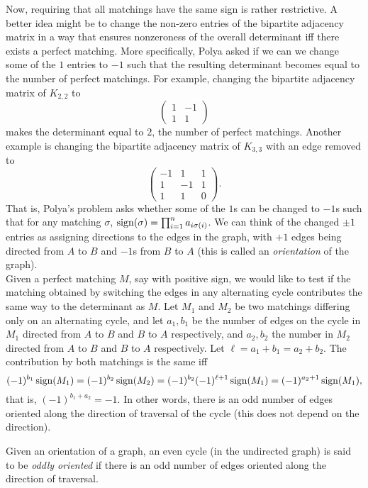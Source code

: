 Now, requiring that all matchings have the same sign is rather restrictive. A better idea might be to change the non-zero entries of the bipartite adjacency matrix in a way that ensures nonzeroness of the overall determinant iff there exists a perfect matching. More specifically, Polya asked if we can we change some of the $1$ entries to $-1$ such that the resulting determinant becomes equal to the number of perfect matchings. For example, changing the bipartite adjacency matrix of $K_{2,2}$ to
\[ \begin{pmatrix} 1 & -1 \\ 1 & 1 \end{pmatrix} \]
makes the determinant equal to $2$, the number of perfect matchings. Another example is changing the bipartite adjacency matrix of $K_{3,3}$ with an edge removed to
\[ \begin{pmatrix} -1 & 1 & 1 \\ 1 & -1 & 1 \\ 1 & 1 & 0 \end{pmatrix}. \]
That is, Polya's problem asks whether some of the $1$s can be changed to $-1$s such that for any matching $\sigma$, $\operatorname{sign}(\sigma) = \prod_{i=1}^{n} a_{i\sigma(i)}$. We can think of the changed $\pm 1$ entries as assigning directions to the edges in the graph, with $+1$ edges being directed from $A$ to $B$ and $-1$s from $B$ to $A$ (this is called an \emph{orientation} of the graph). \\
Given a perfect matching $M$, say with positive sign, we would like to test if the matching obtained by switching the edges in any alternating cycle contributes the same way to the determinant as $M$. Let $M_1$ and $M_2$ be two matchings differing only on an alternating cycle, and let $a_1,b_1$ be the number of edges on the cycle in $M_1$ directed from $A$ to $B$ and $B$ to $A$ respectively, and $a_2,b_2$ the number in $M_2$ directed from $A$ to $B$ and $B$ to $A$ respectively. Let $\ell = a_1+b_1 = a_2+b_2$. The contribution by both matchings is the same iff
\[ (-1)^{b_1} \operatorname{sign}(M_1) = (-1)^{b_2} \operatorname{sign}(M_2) = (-1)^{b_2} (-1)^{\ell+1} \operatorname{sign}(M_1) = (-1)^{a_2+1} \operatorname{sign}(M_1), \]
that is, $(-1)^{b_1+a_2} = -1$. In other words, there is an odd number of edges oriented along the direction of traversal of the cycle (this does not depend on the direction).
\begin{fdef}
	Given an orientation of a graph, an even cycle (in the undirected graph) is said to be \emph{oddly oriented} if there is an odd number of edges oriented along the direction of traversal.
\end{fdef}

